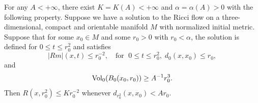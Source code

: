 \begin{theorem}
  \label{thm:cz-almost-euclidean-volume-curvature-control}

For any $A<+\infty$, there exist $K=K(A)<+\infty$ and
$\alpha=\alpha(A)>0$ with the following property. Suppose we have
a solution to the Ricci flow on a three-dimensional, compact and
orientable manifold $M$ with normalized initial metric. Suppose
that for some $x_0\in M$ and some $r_0>0$ with $r_0<\alpha$, the
solution is defined for $0\le t\le r_0^2$ and satisfies
$$
|Rm|(x,t)\le r_0^{-2},\quad \text{for }\; 0\le t\le
r_0^2,\;d_0(x,x_0)\le r_0,
$$
and
$$
\operatorname{Vol}_0(B_0(x_0,r_0))\ge A^{-1}r_0^3.
$$
Then $R(x,r_0^2)\le Kr_0^{-2}$ whenever $d_{r_0^2}(x,x_0)<Ar_0$.
\end{theorem}

